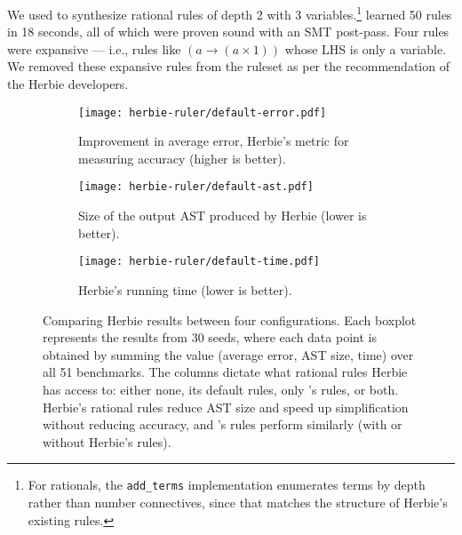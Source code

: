 We used  to synthesize rational rules of depth 2 with 3 variables.\footnote{
  For rationals, the \lstinline{add_terms} implementation enumerates terms by depth rather
  than number connectives, since that matches the structure of Herbie's
  existing rules.
}
 learned 50 rules in 18 seconds, all of which were proven sound with an SMT post-pass.
Four rules were expansive --- i.e., rules like $( a \to (a \times 1) )$ whose LHS is only a variable.
We removed these expansive rules from the ruleset as per the recommendation of
  the Herbie developers.

\begin{figure}
\begin{subfigure}[t]{0.3\linewidth}
   \texttt{[image: herbie-ruler/default-error.pdf]}
   \caption{
     Improvement in average error,
     Herbie's metric for measuring accuracy
     (higher is better).
    }
\end{subfigure}
\hfill
\begin{subfigure}[t]{0.3\linewidth}
   \texttt{[image: herbie-ruler/default-ast.pdf]}
   \caption{
     Size of the output AST produced by Herbie
     (lower is better).
   }
\end{subfigure}
\hfill
\begin{subfigure}[t]{0.3\linewidth}
  \texttt{[image: herbie-ruler/default-time.pdf]}
  \caption{
  Herbie's running time (lower is better).
  }
\end{subfigure}
\caption{
 Comparing Herbie results between four configurations.
Each boxplot represents the results from 30 seeds,
 where each data point is obtained by summing the value
 (average error, AST size, time) over all 51 benchmarks.
The columns dictate what rational rules Herbie has access to:
 either none, its default rules, only 's rules, or both.
Herbie's rational rules reduce AST size
 and speed up simplification without reducing accuracy,
 and 's rules perform similarly (with or without Herbie's rules).
}
\label{fig:ruler-herbie}
\end{figure}

